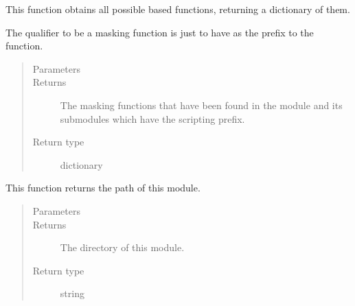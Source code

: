 \documentclass[letterpaper,10pt,english]{sphinxmanual}
\begin{document}

\begin{fulllineitems}
\label{\detokenize{docstrings/ifa_smeargle.runtime:ifa_smeargle.runtime.get_mask_functions}}
This function obtains all possible  based
functions, returning a dictionary of them.

The qualifier to be a masking function is just to have 
as the prefix to the function.
\begin{quote}\begin{description}
\item[{Parameters}] \leavevmode
{} \textendash{} 

\item[{Returns}] \leavevmode
{} \textendash{} The masking functions that have been found in the module
and its sub\sphinxhyphen{}modules which have the scripting prefix.

\item[{Return type}] \leavevmode
dictionary

\end{description}\end{quote}

\end{fulllineitems}


\begin{fulllineitems}
\label{\detokenize{docstrings/ifa_smeargle.runtime:ifa_smeargle.runtime.get_module_directory}}
This function returns the path of this module.
\begin{quote}\begin{description}
\item[{Parameters}] \leavevmode
{} \textendash{} 

\item[{Returns}] \leavevmode
{} \textendash{} The directory of this module.

\item[{Return type}] \leavevmode
string

\end{description}\end{quote}

\end{fulllineitems}
\end{document}
